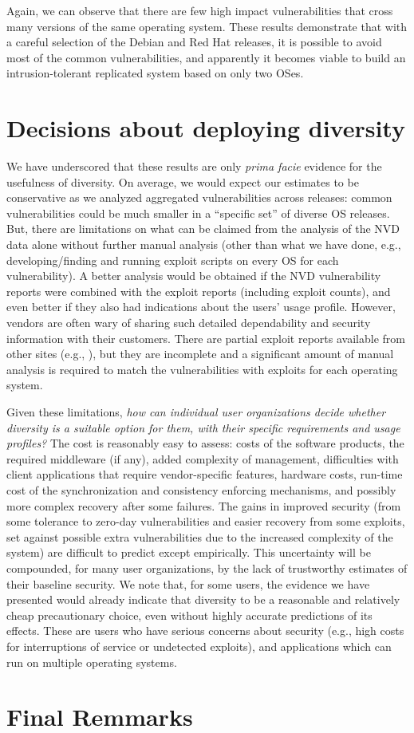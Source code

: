 Again, we can observe that there are few high impact vulnerabilities that cross many versions of the same operating system. These results demonstrate that with a careful selection of the Debian and Red Hat releases, it is possible to avoid most of the common vulnerabilities, and apparently it becomes viable to build an intrusion-tolerant replicated system based on only two OSes.


\section{Decisions about deploying diversity}\label{decisions}
We have underscored that these results are only \textit{prima facie} evidence for the usefulness of diversity. 
On average, we would expect our estimates to be conservative as we analyzed aggregated vulnerabilities across releases: common vulnerabilities could be much smaller in a ``specific set'' of diverse OS releases. But, there are limitations on what can be claimed from the analysis of the NVD data alone without further manual analysis (other than what we have done, e.g., developing/finding and running exploit scripts on every OS for each vulnerability).
A better analysis would be obtained if the NVD vulnerability reports were combined with the exploit reports (including exploit counts), and even better if they also had indications about the users' usage profile.
However, vendors are often wary of sharing such detailed dependability and security information with their customers.
There are partial exploit reports available from other sites (e.g., \cite{cvedetails}), but they are incomplete and a significant amount of manual analysis is required to match the vulnerabilities with exploits for each operating system.


Given these limitations, \emph{how can individual user organizations decide whether diversity is a suitable option for them, with their specific requirements and usage profiles?}
The cost is reasonably easy to assess: costs of the software products, the required middleware (if any), added complexity of management, difficulties with client applications that require vendor-specific features, hardware costs, run-time cost of the synchronization and consistency enforcing mechanisms, and possibly more complex recovery after some failures.
The gains in improved security (from some tolerance to zero-day vulnerabilities and easier recovery from some exploits, set against possible extra vulnerabilities due to the increased complexity of the system) are difficult to predict except empirically. 
This uncertainty will be compounded, for many user organizations, by the lack of trustworthy estimates of their baseline security.
We note that, for some users, the evidence we have presented would already indicate that diversity to be a reasonable and relatively cheap precautionary choice, even without highly accurate predictions of its effects.
These are users who have serious concerns about security (e.g., high costs for interruptions of service or undetected exploits), and applications which can run on multiple operating systems.


\section{Final Remmarks}
